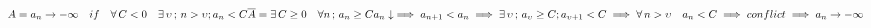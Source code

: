 \documentclass{article}
\begin{document}
    \begin{math}
        \\
        A = a_n \to -\infty \quad if \quad \forall\, C < 0 \quad \exists\, \upsilon\,;\, n > \upsilon ; a_n < C\\
        \\
        \overline{A} = \exists\, C \geq 0 \quad \forall n\,;\, a_n \geq C\\
        \\
        a_n\downarrow \implies a_{n + 1} < a_n \implies \exists\, \upsilon\,;\, a_\upsilon \geq C; a_{\upsilon + 1} < C\\
        \\
        \implies \forall\, n > \upsilon \quad a_n < C \implies conflict\\
        \\
        \implies a_n \to -\infty
    \end{math}
\end{document}
